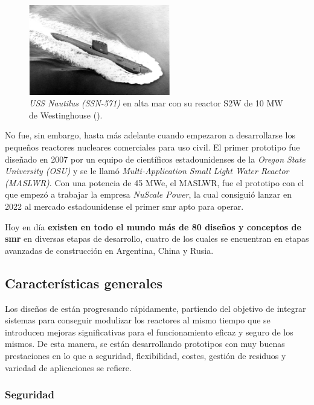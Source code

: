 \begin{figure}[h]
    \centering
    \includegraphics[width=0.55\textwidth]{content/figures/nautilus.jpg}
    \caption{\emph{USS Nautilus (SSN-571)} en alta mar con su reactor S2W de 10 MW de Westinghouse (\cite{poder_naval}).}
    \label{fig:nautilus}
\end{figure}

No fue, sin embargo, hasta más adelante cuando empezaron a desarrollarse los pequeños reactores nucleares comerciales para uso civil. El primer prototipo fue diseñado en 2007 por un equipo de científicos estadounidenses de la \emph{Oregon State University (OSU)} y se le llamó \emph{Multi-Application Small Light Water Reactor (MASLWR)}. Con una potencia de 45 MWe, el MASLWR, fue el prototipo con el que empezó a trabajar la empresa \emph{NuScale Power}, la cual consiguió lanzar en 2022 al mercado estadounidense el primer \acrshort{smr} apto para operar.

Hoy en día \textbf{existen en todo el mundo más de 80 diseños y conceptos de \acrshort{smr}} en diversas etapas de desarrollo, cuatro de los cuales se encuentran en etapas avanzadas de construcción en Argentina, China y Rusia.

\subsection{Características generales}

Los diseños de  están progresando rápidamente, partiendo del objetivo de integrar sistemas para conseguir modulizar los reactores al mismo tiempo que se introducen mejoras significativas para el funcionamiento eficaz y seguro de los mismos. De esta manera, se están desarrollando prototipos con muy buenas prestaciones en lo que a seguridad, flexibilidad, costes, gestión de residuos y variedad de aplicaciones se refiere.

\subsubsection{Seguridad} \label{seguridad}

